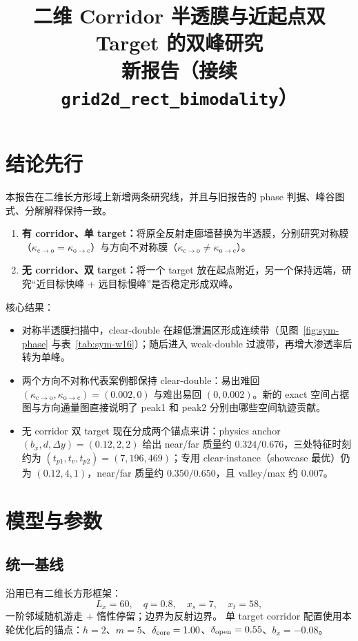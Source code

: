 \documentclass[11pt,fontset=fandol]{ctexart}
\title{二维 Corridor 半透膜与近起点双 Target 的双峰研究\\\large 新报告（接续 \texttt{grid2d\_rect\_bimodality}）}
\author{}
\date{}
\begin{document}
\maketitle

\section*{结论先行}
本报告在二维长方形域上新增两条研究线，并且与旧报告的 phase 判据、峰谷图式、分解解释保持一致。
\begin{enumerate}
  \item \textbf{有 corridor、单 target：}将原全反射走廊墙替换为半透膜，分别研究对称膜（$\kappa_{\mathrm{c\to o}}=\kappa_{\mathrm{o\to c}}$）与方向不对称膜（$\kappa_{\mathrm{c\to o}}\neq\kappa_{\mathrm{o\to c}}$）。
  \item \textbf{无 corridor、双 target：}将一个 target 放在起点附近，另一个保持远端，研究“近目标快峰 + 远目标慢峰”是否稳定形成双峰。
\end{enumerate}

核心结果：
\begin{itemize}
  \item 对称半透膜扫描中，clear-double 在超低泄漏区形成连续带（见图~\ref{fig:sym-phase} 与表~\ref{tab:sym-w16}）；随后进入 weak-double 过渡带，再增大渗透率后转为单峰。
  \item 两个方向不对称代表案例都保持 clear-double：易出难回 $(\kappa_{\mathrm{c\to o}},\kappa_{\mathrm{o\to c}})=(0.002,0)$ 与难出易回 $(0,0.002)$。新的 exact 空间占据图与方向通量图直接说明了 peak1 和 peak2 分别由哪些空间轨迹贡献。
  \item 无 corridor 双 target 现在分成两个锚点来讲：physics anchor $(b_x,d,\Delta y)=(0.12,2,2)$ 给出 near/far 质量约 $0.324/0.676$，三处特征时刻约为 $(t_{p1},t_v,t_{p2})=(7,196,469)$；专用 clear-instance（showcase 最优）仍为 $(0.12,4,1)$，near/far 质量约 $0.350/0.650$，且 valley/max 约 $0.007$。
\end{itemize}

\section{模型与参数}
\subsection{统一基线}
沿用已有二维长方形框架：
\[
L_x=60,\quad q=0.8,\quad x_s=7,\quad x_t=58,
\]
一阶邻域随机游走 + 惰性停留；边界为反射边界。
单 target corridor 配置使用本轮优化后的锚点：$h=2$、$m=5$、$\delta_{\rm core}=1.00$、$\delta_{\rm open}=0.55$、$b_x=-0.08$。
\end{document}
